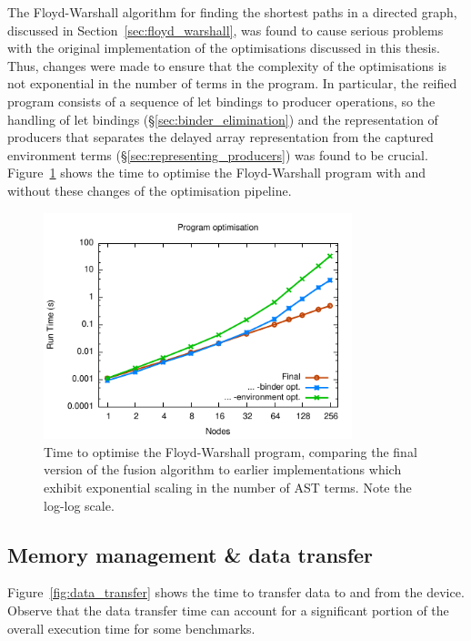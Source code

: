 The Floyd-Warshall algorithm for finding the shortest paths in a directed graph,
discussed in Section~\ref{sec:floyd_warshall}, was found to cause serious
problems with the original implementation of the optimisations discussed in this
thesis. Thus, changes were made to ensure that the complexity of the
optimisations is not exponential in the number of terms in the program. In
particular, the reified program consists of a sequence of let bindings to
producer operations, so the handling of let bindings
(\S\ref{sec:binder_elimination}) and the representation of producers that
separates the delayed array representation from the captured environment terms
(\S\ref{sec:representing_producers}) was found to be crucial.
Figure~\ref{fig:convertAcc} shows the time to optimise the Floyd-Warshall
program with and without these changes of the optimisation pipeline.

\begin{figure}
    \begin{center}
        \includegraphics[width=0.8\textwidth]{images/results/convertAcc/convertAcc}
    \end{center}
    \caption[Program optimisation runtimes]{Time to optimise the Floyd-Warshall
        program, comparing the final version of the fusion algorithm to earlier
        implementations which exhibit exponential scaling in the number of AST
        terms. Note the log-log scale.}
    \label{fig:convertAcc}
\end{figure}

\subsection{Memory management \& data transfer}

Figure~\ref{fig:data_transfer} shows the time to transfer data to and from the
device. Observe that the data transfer time can account for a significant
portion of the overall execution time for some benchmarks.

